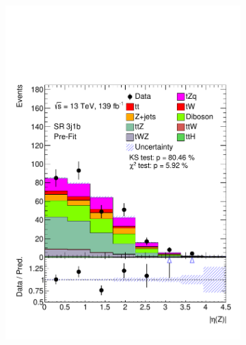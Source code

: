 \begin{figure}[h!]
\begin{subfigure}[b]{0.33\linewidth}
    \includegraphics[width=\linewidth]{ubonn-thesis/Chapters/Chapters_05/Figure/SR/SR_3j1b_Z_eta.pdf} 
  \end{subfigure}
  \begin{subfigure}[b]{0.33\linewidth}
    \centering

\end{subfigure}
\end{figure}
